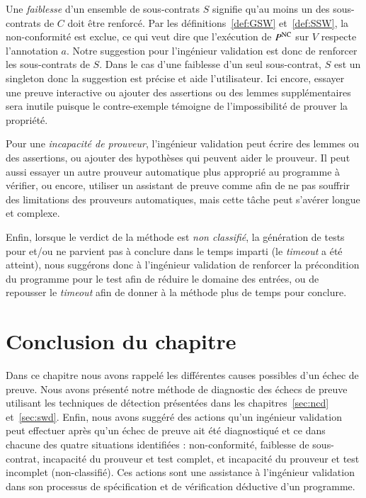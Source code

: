 Une \emph{faiblesse} d'un ensemble de sous-contrats $S$ signifie qu'au moins un
des sous-contrats de $C$ doit être renforcé.
Par les définitions~\ref{def:GSW} et~\ref{def:SSW}, la non-conformité est
exclue, ce qui veut dire que l'exécution de $P^{\mathrm{NC}}$ sur $V$ respecte
l'annotation $a$.
Notre suggestion pour l'ingénieur validation est donc de renforcer les
sous-contrats de $S$.
Dans le cas d'une faiblesse d'un seul sous-contrat, $S$ est un singleton donc
la suggestion est précise et aide l'utilisateur.
Ici encore, essayer une preuve interactive ou ajouter des assertions ou des
lemmes supplémentaires sera inutile puisque le contre-exemple témoigne de
l'impossibilité de prouver la propriété.

Pour une \emph{incapacité de prouveur}, l'ingénieur validation peut écrire des
lemmes ou des assertions, ou ajouter des hypothèses qui peuvent aider le
prouveur.
Il peut aussi essayer un autre prouveur automatique plus approprié au programme
à vérifier, ou encore, utiliser un assistant de preuve comme \coq afin de ne
pas souffrir des limitations des prouveurs automatiques, mais cette tâche peut
s'avérer longue et complexe.

Enfin, lorsque le verdict de la méthode est \emph{non classifié}, la génération
de tests pour \NCD et/ou \SWD ne parvient pas à conclure dans le temps imparti
(le {\em timeout} a été atteint), nous suggérons donc à l'ingénieur validation
de renforcer la précondition du programme pour le test afin de réduire le
domaine des entrées, ou de repousser le {\em timeout} afin de donner à la
méthode plus de temps pour conclure.


\section*{Conclusion du chapitre}


Dans ce chapitre nous avons rappelé les différentes causes possibles d'un échec
de preuve.
Nous avons présenté notre méthode de diagnostic des échecs de
preuve utilisant les techniques de détection présentées dans les
chapitres~\ref{sec:ncd} et~\ref{sec:swd}.
Enfin, nous avons suggéré des actions qu'un ingénieur validation peut effectuer
après qu'un échec de preuve ait été diagnostiqué et ce dans chacune des quatre
situations identifiées : non-conformité, faiblesse de sous-contrat, incapacité
du prouveur et test complet, et incapacité du prouveur et test incomplet
(non-classifié).
Ces actions sont une assistance à l'ingénieur validation dans son processus de
spécification et de vérification déductive d'un programme.
